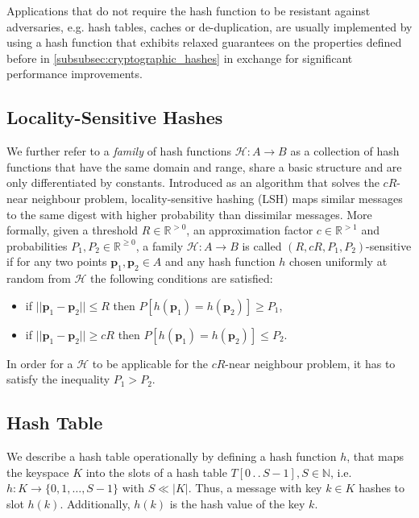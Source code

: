 Applications that do not require the hash function to be resistant against adversaries, e.g. hash tables, caches or de-duplication, are usually implemented by using a hash function that exhibits relaxed guarantees on the properties defined before in \ref{subsubsec:cryptographic_hashes} in exchange for significant performance improvements.

\subsection{Locality-Sensitive Hashes} \label{subsec:locality-sensitive-hashes}
We further refer to a \textit{family} of hash functions $\mathcal{H}: A \rightarrow B$ as a collection of hash functions that have the same domain and range, share a basic structure and are only differentiated by constants.
Introduced as an algorithm that solves the $cR$-near neighbour problem, locality-sensitive hashing (LSH) \cite{indyk_approximate_1998} maps similar messages to the same digest with higher probability than dissimilar messages. More formally, given a threshold $R \in \mathbb{R}^{>0}$, an approximation factor $c \in \mathbb{R}^{>1}$ and probabilities $P_1, P_2 \in \mathbb{R}^{\geq 0}$, a family $\mathcal{H}: A \rightarrow B$ is called $(R, cR, P_1, P_2)$-sensitive if for any two points $\bm{p}_1, \bm{p}_2 \in A$ and any hash function $h$ chosen uniformly at random from $\mathcal{H}$ the following conditions are satisfied:

\begin{itemize}
    \item if $|| \bm{p}_1 - \bm{p}_2 || \leq R$ then $P[h(\bm{p}_1)=h(\bm{p}_2)] \geq P_1$,
    \item if $|| \bm{p}_1 - \bm{p}_2 || \geq cR$ then $P[h(\bm{p}_1)=h(\bm{p}_2)] \leq P_2$.
\end{itemize}

In order for a $\mathcal{H}$ to be applicable for the $cR$-near neighbour problem, it has to satisfy the inequality $P_1 > P_2$.



\subsection{Hash Table} \label{subsec:hash_table}
We describe a hash table operationally by defining a hash function $h$, that maps the keyspace $K$ into the slots of a hash table $T[0 \,.\,.\, S-1], S \in \mathbb{N}$, i.e. $h: K \rightarrow \{0, 1, \dots, S-1\}$ with $S \ll |K|$. Thus, a message with key $k \in K$ hashes to slot $h(k)$. Additionally, $h(k)$ is the hash value of the key $k$.

